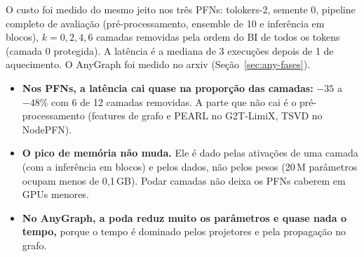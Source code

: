 \documentclass[12pt,a4paper]{article}
\begin{document}
O custo foi medido do mesmo jeito nos três PFNs: tolokers-2, semente 0, pipeline completo de avaliação (pré-processamento, ensemble de 10 e inferência em blocos), $k = 0, 2, 4, 6$ camadas removidas pela ordem do BI de todos os tokens (camada 0 protegida). A latência é a mediana de 3 execuções depois de 1 de aquecimento. O AnyGraph foi medido no arxiv (Seção~\ref{sec:any-fases}).

\begin{table}[H]
\centering
\caption{Custo por número de camadas removidas: parâmetros (M), latência de uma avaliação completa (s) e pico de memória da GPU (GB). Entre parênteses, a variação em relação ao modelo inteiro.}
\label{tab:custo}
\end{table}

\begin{itemize}
  \item \textbf{Nos PFNs, a latência cai quase na proporção das camadas:} $-35$ a $-48\%$ com 6 de 12 camadas removidas. A parte que não cai é o pré-processamento (features de grafo e PEARL no G2T-LimiX, TSVD no NodePFN).
  \item \textbf{O pico de memória não muda.} Ele é dado pelas ativações de uma camada (com a inferência em blocos) e pelos dados, não pelos pesos (20\,M parâmetros ocupam menos de 0,1\,GB). Podar camadas não deixa os PFNs caberem em GPUs menores.
  \item \textbf{No AnyGraph, a poda reduz muito os parâmetros e quase nada o tempo,} porque o tempo é dominado pelos projetores e pela propagação no grafo.
\end{itemize}
\end{document}
